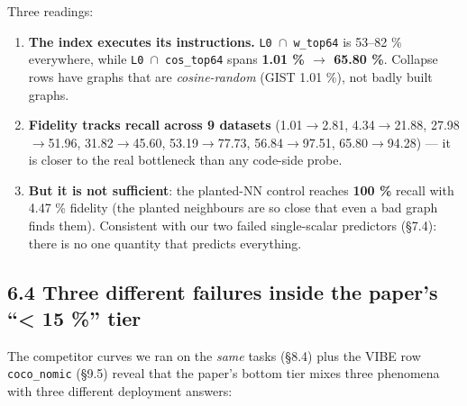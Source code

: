 \documentclass[
  10pt,
]{article}
\providecommand{\tightlist}{%
  \setlength{\itemsep}{0pt}\setlength{\parskip}{0pt}}
\begin{document}
Three readings:

\begin{enumerate}
\def\labelenumi{\arabic{enumi}.}
\tightlist
\item
  \textbf{The index executes its instructions.} \texttt{L0\ $\cap$\ w\_top64}
  is 53--82 \% everywhere, while \texttt{L0\ $\cap$\ cos\_top64} spans
  \textbf{1.01 \% $\rightarrow$ 65.80 \%}. Collapse rows have graphs that are
  \emph{cosine-random} (GIST 1.01 \%), not badly built graphs.
\item
  \textbf{Fidelity tracks recall across 9 datasets} (1.01$\rightarrow$2.81,
  4.34$\rightarrow$21.88, 27.98$\rightarrow$51.96, 31.82$\rightarrow$45.60, 53.19$\rightarrow$77.73, 56.84$\rightarrow$97.51,
  65.80$\rightarrow$94.28) --- it is closer to the real bottleneck than any
  code-side probe.
\item
  \textbf{But it is not sufficient}: the planted-NN control reaches
  \textbf{100 \%} recall with 4.47 \% fidelity (the planted neighbours
  are so close that even a bad graph finds them). Consistent with our
  two failed single-scalar predictors (§7.4): there is no one quantity
  that predicts everything.
\end{enumerate}

\subsection{6.4 Three different failures inside the paper's
``\textless{} 15 \%''
tier}\label{three-different-failures-inside-the-papers-15-tier}

The competitor curves we ran on the \emph{same} tasks (§8.4) plus the
VIBE row \texttt{coco\_nomic} (§9.5) reveal that the paper's bottom tier
mixes three phenomena with three different deployment answers:
\end{document}
